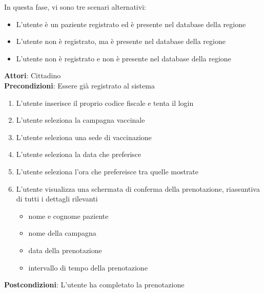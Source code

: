 \documentclass{article}
\begin{document}
In questa fase, vi sono tre scenari alternativi:

\begin{itemize}
    \item L'utente è un paziente registrato ed è presente nel database della regione
    \item L'utente non è registrato, ma è presente nel database della regione
    \item L'utente non è registrato e non è presente nel database della regione
\end{itemize}

\begin{framed}
    \noparskip{}
    \textbf{Attori}: Cittadino\\
    \textbf{Precondizioni}: Essere già registrato al sistema
    \begin{enumerate}
        \item L'utente inserisce il proprio codice fiscale e tenta il login
        \item L'utente seleziona la campagna vaccinale 
        \item L'utente seleziona una sede di vaccinazione
        \item L'utente seleziona la data che preferisce
        \item L'utente seleziona l'ora che prefereisce tra quelle mostrate
        \item L'utente visualizza una schermata di conferma della prenotazione, riassuntiva di tutti i dettagli rilevanti
            \begin{itemize}
                \item nome e cognome paziente
                \item nome della campagna
                \item data della prenotazione
                \item intervallo di tempo della prenotazione
            \end{itemize}
    \end{enumerate}
    \textbf{Postcondizioni}: L'utente ha completato la prenotazione
\end{framed}
\end{document}
